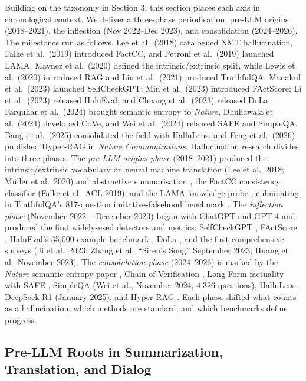 \documentclass{article}
\begin{document}
Building on the taxonomy in Section 3, this section places each axis in chronological context. We deliver a three-phase periodisation: pre-LLM origins (2018--2021), the inflection (Nov 2022--Dec 2023), and consolidation (2024--2026). The milestones run as follows. Lee et al.~(2018) catalogued NMT hallucination, Falke et al.~(2019) introduced FactCC, and Petroni et al.~(2019) launched LAMA. Maynez et al.~(2020) defined the intrinsic/extrinsic split, while Lewis et al.~(2020) introduced RAG and Lin et al.~(2021) produced TruthfulQA. Manakul et al.~(2023) launched SelfCheckGPT; Min et al.~(2023) introduced FActScore; Li et al.~(2023) released HaluEval; and Chuang et al.~(2023) released DoLa. Farquhar et al.~(2024) brought semantic entropy to \emph{Nature}, Dhuliawala et al.~(2024) developed CoVe, and Wei et al.~(2024) released SAFE and SimpleQA. Bang et al.~(2025) consolidated the field with HalluLens, and Feng et al.~(2026) published Hyper-RAG in \emph{Nature Communications}. Hallucination research divides into three phases. The \emph{pre-LLM origins phase} (2018--2021) produced the intrinsic/extrinsic vocabulary on neural machine translation (Lee et al.~2018; Müller et al.~2020) and abstractive summarisation \citep{maynez2020onfaithfulnessandf}, the FactCC consistency classifier (Falke et al.~ACL 2019), and the LAMA knowledge probe \citep{petroni2019languagemodelsaskn}, culminating in TruthfulQA's 817-question imitative-falsehood benchmark \citep{lin2022truthfulqameasurin}. The \emph{inflection phase} (November 2022 -- December 2023) began with ChatGPT and GPT-4 and produced the first widely-used detectors and metrics: SelfCheckGPT \citep{manakul2023selfcheckgptzerore}, FActScore \citep{min2023factscorefinegrain}, HaluEval's 35,000-example benchmark \citep{li2023haluevalalargescal}, DoLa \citep{chuang2023doladecodingbycont}, and the first comprehensive surveys (Ji et al.~2023; Zhang et al.~``Siren's Song'' September 2023; Huang et al.~November 2023). The \emph{consolidation phase} (2024--2026) is marked by the \emph{Nature} semantic-entropy paper \citep{farquhar2024detectinghallucina}, Chain-of-Verification \citep{dhuliawala2024chainofverificatio}, Long-Form factuality with SAFE \citep{wei2024longformfactuality}, SimpleQA (Wei et al., November 2024, 4,326 questions), HalluLens \citep{bang2025hallulensllmhalluc}, DeepSeek-R1 (January 2025), and Hyper-RAG \citep{feng2026hyperragcombatingl}. Each phase shifted what counts as a hallucination, which methods are standard, and which benchmarks define progress.

\subsection{Pre-LLM Roots in Summarization, Translation, and Dialog}\label{pre-llm-roots-in-summarization-translation-and-dialog}
\end{document}
